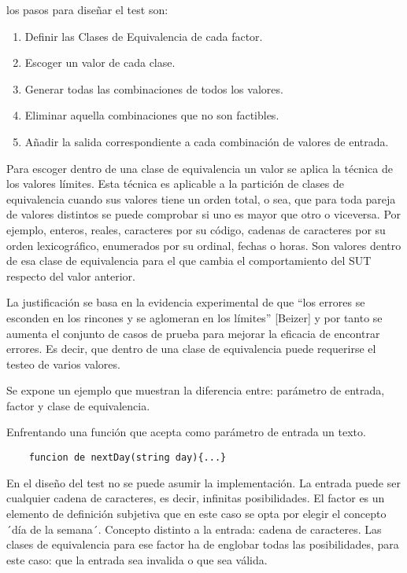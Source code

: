 los pasos para diseñar el test son:
\begin{enumerate}
    \item Definir las Clases de Equivalencia de cada factor.
    \item Escoger un valor de cada clase.
    \item Generar todas las combinaciones de todos los valores.
    \item Eliminar aquella combinaciones que no son factibles.
    \item Añadir la salida correspondiente a cada combinación de valores de entrada.
\end{enumerate}

Para escoger dentro de una clase de equivalencia un valor se aplica la técnica de los valores límites.
Esta técnica es aplicable a la partición de clases de equivalencia cuando sus valores tiene un orden total, o sea, que para toda pareja de valores distintos se puede comprobar si uno es mayor que otro o viceversa.
Por ejemplo, enteros, reales, caracteres por su código, cadenas de caracteres por su orden lexicográfico, enumerados por su ordinal, fechas o horas.
Son valores dentro de esa clase de equivalencia para el que cambia el comportamiento del SUT respecto del valor anterior.

La justificación se basa en la evidencia experimental de que “los errores se esconden en los rincones y se aglomeran en los límites” [Beizer] y por tanto se aumenta el conjunto de casos de prueba para mejorar la eficacia de encontrar errores.
Es decir, que dentro de una clase de equivalencia puede requerirse el testeo de varios valores.

Se expone un ejemplo que muestran la diferencia entre: parámetro de entrada, factor y clase de equivalencia.

Enfrentando una función que acepta como parámetro de entrada un texto.

\begin{verbatim}
    funcion de nextDay(string day){...}
\end{verbatim}

En el diseño del test no se puede asumir la implementación.
La entrada puede ser cualquier cadena de caracteres, es decir, infinitas posibilidades.
El factor es un elemento de definición subjetiva que en este caso se opta por elegir el concepto ´día de la semana´.
Concepto distinto a la entrada: cadena de caracteres.
Las clases de equivalencia para ese factor ha de englobar todas las posibilidades, para este caso: que la entrada sea invalida o que sea válida.

